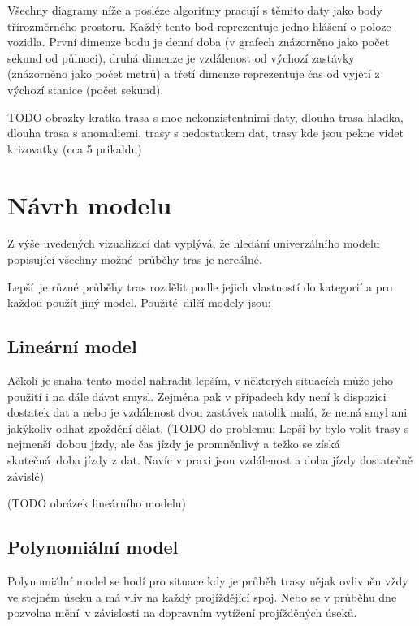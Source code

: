 Všechny diagramy níže a posléze algoritmy pracují s těmito daty jako body třírozměrného prostoru. Každý tento bod reprezentuje jedno hlášení o poloze vozidla. První dimenze bodu je denní doba (v grafech znázorněno jako počet sekund od půlnoci), druhá dimenze je vzdálenost od výchozí zastávky (znázorněno jako počet metrů) a třetí dimenze reprezentuje čas od vyjetí z výchozí stanice (počet sekund).

TODO obrazky kratka trasa s moc nekonzistentnimi daty, dlouha trasa hladka, dlouha trasa s anomaliemi, trasy s nedostatkem dat, trasy kde jsou pekne videt krizovatky (cca 5 prikaldu)


\section{Návrh modelu}

Z výše uvedených vizualizací dat vyplývá, že hledání univerzálního modelu popisující všechny možné průběhy tras je nereálné.

\bigbreak

Lepší je různé průběhy tras rozdělit podle jejich vlastností do kategorií a pro každou použít jiný model. Použité dílčí modely jsou:


\subsection{Lineární model}

Ačkoli je snaha tento model nahradit lepším, v některých situacích může jeho použití i na dále dávat smysl. Zejména pak v případech kdy není k dispozici dostatek dat a nebo je vzdálenost dvou zastávek natolik malá, že nemá smyl ani jakýkoliv odhat zpoždění dělat. (TODO do problemu: Lepší by bylo volit trasy s nejmenší dobou jízdy, ale čas jízdy je promněnlivý a težko se získá skutečná doba jízdy z dat. Navíc v praxi jsou vzdálenost a doba jízdy dostatečně závislé)

(TODO obrázek lineárního modelu)


\subsection{Polynomiální model}

Polynomiální model se hodí pro situace kdy je průběh trasy nějak ovlivněn vždy ve stejném úseku a má vliv na každý projíždějící spoj. Nebo se v průběhu dne pozvolna mění v závislosti na dopravním vytížení projížděných úseků.

\bigbreak

